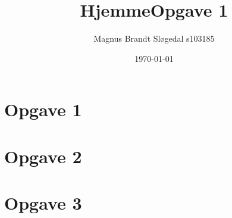 \documentclass[11pt,a4paper]{article}
\begin{document}
\title{HjemmeOpgave 1}
\author{Magnus Brandt Sløgedal s103185}
\date{\today}
\maketitle
\section*{Opgave 1}

\newpage
\section*{Opgave 2}

\section*{Opgave 3}


\end{document}
